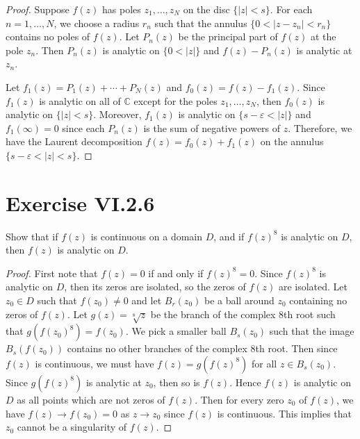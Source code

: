 \documentclass[12pt]{article}
\newenvironment{problem}
    {\begin{lrbox}{\mybox}\begin{minipage}{0.98\textwidth}}
    {\end{minipage}\end{lrbox}\begin{center}\framebox[\textwidth]{\usebox{\mybox}}\end{center}}
\theoremstyle{definition}
\newcommand{\C}{\mathbb{C}}
\newcommand{\eps}{\varepsilon}
\begin{document}
\begin{proof}
    Suppose $f(z)$ has poles $z_1, \dots, z_N$ on the disc $\{|z| < s\}$. For each $n = 1, \dots, N$, we choose a radius $r_n$ such that the annulus $\{0 < |z - z_n| < r_n\}$ contains no poles of $f(z)$. Let $P_n(z)$ be the principal part of $f(z)$ at the pole $z_n$. Then $P_n(z)$ is analytic on $\{0 < |z|\}$ and $f(z) - P_n(z)$ is analytic at $z_n$.
    
    Let $f_1(z) = P_1(z) + \cdots + P_N(z)$ and $f_0(z) = f(z) - f_1(z)$. Since $f_1(z)$ is analytic on all of $\C$ except for the poles $z_1, \dots, z_N$, then $f_0(z)$ is analytic on $\{|z| < s\}$. Moreover, $f_1(z)$ is analytic on $\{s - \eps < |z|\}$ and $f_1(\infty) = 0$ since each $P_n(z)$ is the sum of negative powers of $z$. Therefore, we have the Laurent decomposition $f(z) = f_0(z) + f_1(z)$ on the annulus $\{s - \eps < |z| < s\}$.

\end{proof}


\section{Exercise VI.2.6}
\begin{problem}
    Show that if $f(z)$ is continuous on a domain $D$, and if $f(z)^8$ is analytic on $D$, then $f(z)$ is analytic on $D$.
\end{problem}

\begin{proof}
    First note that $f(z) = 0$ if and only if $f(z)^8 = 0$. Since $f(z)^8$ is analytic on $D$, then its zeros are isolated, so the zeros of $f(z)$ are isolated. Let $z_0 \in D$ such that $f(z_0) \ne 0$ and let $B_r(z_0)$ be a ball around $z_0$ containing no zeros of $f(z)$. Let $g(z) = \sqrt[8]{z}$ be the branch of the complex $8$th root such that $g(f(z_0)^8) = f(z_0)$. We pick a smaller ball $B_s(z_0)$ such that the image $B_s(f(z_0))$ contains no other branches of the complex $8$th root. Then since $f(z)$ is continuous, we must have $f(z) = g(f(z)^8)$ for all $z \in B_s(z_0)$. Since $g(f(z)^8)$ is analytic at $z_0$, then so is $f(z)$. Hence $f(z)$ is analytic on $D$ as all points which are not zeros of $f(z)$. Then for every zero $z_0$ of $f(z)$, we have $f(z) \to f(z_0) = 0$ as $z \to z_0$ since $f(z)$ is continuous. This implies that $z_0$ cannot be a singularity of $f(z)$.
    
\end{proof}
\end{document}
